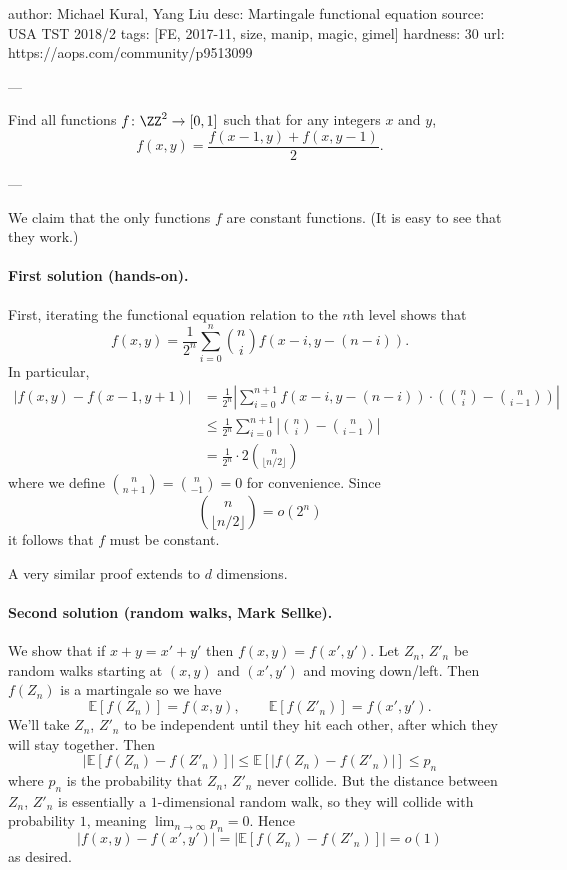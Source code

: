 author: Michael Kural, Yang Liu
desc: Martingale functional equation
source: USA TST 2018/2
tags: [FE, 2017-11, size, manip, magic, gimel]
hardness: 30
url: https://aops.com/community/p9513099

---

Find all functions $f \colon \ZZ^2 \to [0,1]$
such that for any integers $x$ and $y$,
\[ f(x, y) = \frac{f(x-1, y) + f(x, y-1)}{2}. \]

---

We claim that the only functions $f$ are constant functions.
(It is easy to see that they work.)

\paragraph{First solution (hands-on).}
First, iterating the functional equation
relation to the $n$th level shows that
\[ f(x, y) = \frac{1}{2^n} \sum_{i=0}^n \binom{n}{i} f(x-i, y-(n-i)). \]
In particular,
\begin{align*}
  |f(x, y) - f(x-1, y+1)|
  &= \frac{1}{2^n} \left\lvert \sum_{i=0}^{n+1} f(x-i, y-(n-i)) \cdot
  \left(\binom{n}{i} - \binom{n}{i-1} \right) \right\rvert \\
  &\le \frac{1}{2^n} \sum_{i=0}^{n+1} \left\lvert
    \binom{n}{i} - \binom{n}{i-1} \right\rvert \\
  &= \frac{1}{2^n} \cdot 2\binom{n}{\lfloor n/2 \rfloor}
\end{align*}
where we define $\binom{n}{n+1} = \binom{n}{-1} = 0$ for convenience.
Since \[ \binom{n}{\lfloor n/2 \rfloor} = o(2^n) \]
it follows that $f$ must be constant.

\begin{remark*}
A very similar proof extends to $d$ dimensions.
\end{remark*}

\paragraph{Second solution (random walks, Mark Sellke).}
We show that if $x+y=x'+y'$ then $f(x,y)=f(x',y')$.
Let $Z_n$, $Z'_n$ be random walks starting at $(x,y)$
and $(x',y')$ and moving down/left.
Then $f(Z_n)$ is a martingale so we have
\[\mathbb E[f(Z_n)]=f(x,y), \qquad
  \mathbb E[f(Z'_n)]=f(x',y') .\]
We'll take $Z_n$, $Z'_n$ to be independent until they hit each other,
after which they will stay together.  Then
\[|\mathbb E[f(Z_n)-f(Z'_n)]| \leq \mathbb E[|f(Z_n)-f(Z'_n)|]
  \leq p_n\]
where $p_n$ is the probability that $Z_n$, $Z'_n$ never collide.
But the distance between $Z_n$, $Z'_n$
is essentially a $1$-dimensional random walk,
so they will collide with probability $1$, meaning $\lim_{n\to\infty} p_n=0$.
Hence
\[ |f(x,y)-f(x',y')| = |\mathbb E[f(Z_n)-f(Z'_n)]| = o(1)\]
as desired.

